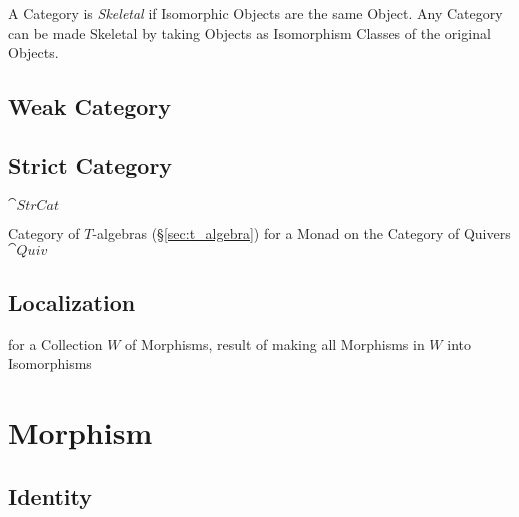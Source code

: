 A Category is \emph{Skeletal} if Isomorphic Objects are the same
Object. Any Category can be made Skeletal by taking Objects as
Isomorphism Classes of the original Objects.



\subsection{Weak Category}\label{sec:weak_category}

\subsection{Strict Category}\label{sec:strict_category}

$\cat{StrCat}$

Category of $T$-algebras (\S\ref{sec:t_algebra}) for a Monad on the
Category of Quivers $\cat{Quiv}$



\subsection{Localization}\label{sec:category_localization}

for a Collection $W$ of Morphisms, result of making all Morphisms in
$W$ into Isomorphisms




\section{Morphism}\label{sec:morphism}

\subsection{Identity}\label{sec:identity_morphism}

